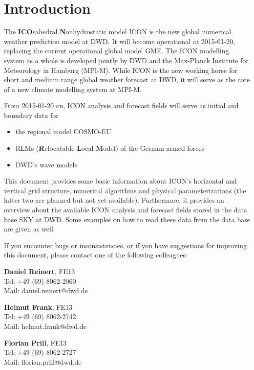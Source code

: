 \chapter{Introduction}

The \textbf{ICO}sahedral \textbf{N}onhydrostatic model ICON is the new global numerical 
weather prediction model at DWD. It will become operational at 2015-01-20, replacing the current 
operational global model GME. The ICON modelling system as a whole is developed jointly by DWD and the 
Max-Planck Institute for Meteorology in Hamburg (MPI-M). While ICON is the new working horse 
for short and medium range global weather forecast at DWD, it will serve as the core of a new climate 
modelling system at MPI-M.

From 2015-01-20 on, ICON analysis and forecast fields will serve as initial and boundary data for
\begin{itemize}
 \item the regional model COSMO-EU
 \item RLMs (\textbf{R}elocatable \textbf{L}ocal \textbf{M}odel) of the German armed forces
 \item DWD's wave models
\end{itemize}

This document provides some basic information about ICON's horizontal and vertical grid structure, 
numerical algorithms and physical parameterizations (the latter two are planned but not yet available). 
Furthermore, it provides an overview about the available ICON analysis and forecast fields stored in the 
data base SKY at DWD. Some examples on how to read these data from the data base are given as well.

\newpage
If you encounter bugs or inconsistencies, or if you have suggestions for improving this document, 
please contact one of the following colleagues:

\begin{note}
\begin{minipage}{\textwidth}
\centering
\begin{minipage}{0.32\textwidth}
 \textbf{Daniel Reinert}, FE13 \\
 Tel: +49 (69) 8062-2060 \\ 
 Mail: daniel.reinert@dwd.de
\end{minipage}
\begin{minipage}{0.32\textwidth}
 \textbf{Helmut Frank}, FE13\\
 Tel: +49 (69) 8062-2742 \\ 
 Mail: helmut.frank@dwd.de
\end{minipage}
\begin{minipage}{0.32\textwidth}
 \textbf{Florian Prill}, FE13 \\
 Tel: +49 (69) 8062-2727 \\ 
 Mail: florian.prill@dwd.de
\end{minipage}
\end{minipage}
\end{note}  